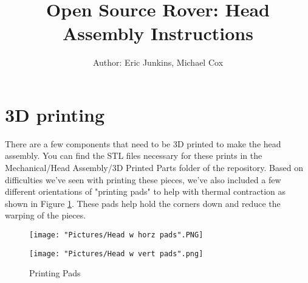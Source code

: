 \documentclass[12pt]{article}
\begin{document}
\title{Open Source Rover: Head Assembly Instructions}
\author{Author: Eric Junkins, Michael Cox}

\makeatletter         
\def\@maketitle{
\begin{center}	
	\makebox[\textwidth][c]{ \texttt{[image: "Pictures/Head final".png]}}
	{\Huge \bfseries \sffamily \@title }\\[3ex] 
	{\Large \sffamily \@author}\\[3ex] 
	\texttt{[image: "Pictures/JPL logo".png]}
\end{center}}
\makeatother

\maketitle



\newpage


\tableofcontents

\newpage

\section{3D printing}
There are a few components that need to be 3D printed to make the head assembly. You can find the STL files necessary for these prints in the Mechanical/Head Assembly/3D Printed Parts folder of the repository.  Based on difficulties we've seen with printing these pieces, we've also included a few different orientations of "printing pads" to help with thermal contraction as shown in Figure \ref{pads}. These pads help hold the corners down and reduce the warping of the pieces.

\begin{figure}[H]
  \centering
  \begin{minipage}[b]{0.45\textwidth}
    \texttt{[image: "Pictures/Head w horz pads".PNG]}
  \end{minipage}
  \hfill
  \begin{minipage}[b]{0.45\textwidth}
    \texttt{[image: "Pictures/Head w vert pads".png]}
  \end{minipage}
  \caption{Printing Pads}
  \label{pads}
\end{figure}
\end{document}
